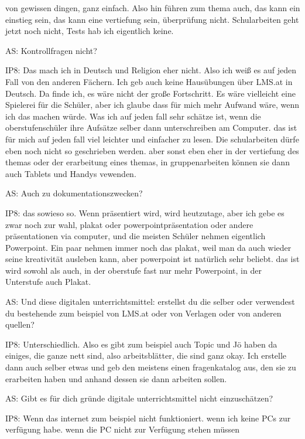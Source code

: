 \documentclass[fontsize=11pt,paper=a4]{scrbook}
\begin{document}
{\begin{itemize*}
		von gewissen dingen, ganz einfach. Also hin führen
		zum thema auch, das kann ein einstieg
		sein, 
		das kann eine vertiefung sein,
		überprüfung nicht. Schularbeiten geht jetzt noch nicht, Tests hab ich eigentlich keine.
		\item[AS:] Kontrollfragen nicht?
		\item[IP8:] Das mach ich in Deutsch und Religion eher nicht. Also ich weiß es auf jeden Fall von den anderen Fächern. Ich geb auch keine Hausübungen über LMS.at in Deutsch. Da finde ich, es wäre nicht der große Fortschritt. Es wäre vielleicht eine Spielerei für die Schüler, aber ich glaube dass für mich
		mehr Aufwand wäre, wenn ich das machen
		würde. Was ich auf jeden fall sehr schätze ist, 
		wenn die oberstufenschüler ihre Aufsätze selber dann unterschreiben am Computer.
		das ist für mich auf jeden fall
		viel leichter und einfacher zu lesen. Die
		schularbeiten dürfe eben noch nicht so geschrieben werden.
		aber sonst eben eher in der vertiefung des themas oder der erarbeitung
		eines themas, in gruppenarbeiten können sie dann auch Tablets und Handys vewenden.
		\item[AS:] Auch zu dokumentationszwecken?
		\item[IP8:] das sowieso so. Wenn präsentiert wird, wird
		heutzutage,  aber ich gebe es zwar noch
		zur wahl, plakat oder powerpointpräsentation oder andere präsentationen
		via computer, und die meisten Schüler nehmen eigentlich Powerpoint. Ein paar nehmen immer noch das plakat, weil
		man da auch wieder seine kreativität
		ausleben kann,  aber powerpoint ist
		natürlich sehr beliebt. das ist wird
		sowohl als auch, in der oberstufe fast
		nur mehr Powerpoint, in der Unterstufe auch Plakat.
		\item[AS:] Und diese digitalen
		unterrichtsmittel: erstellst du die selber
		oder verwendest du bestehende zum
		beispiel von LMS.at oder von Verlagen oder von anderen quellen?
		\item[IP8:]	Unterschiedlich. Also es gibt zum
		beispiel auch Topic und Jö haben da
		einiges,  die ganze nett sind,  also
		arbeitsblätter, die sind ganz okay. Ich
		erstelle dann auch selber etwas und geb
		den meistens einen fragenkatalog aus, den sie zu
		erarbeiten haben und anhand dessen sie dann arbeiten sollen.
		\item[AS:] Gibt es für dich gründe digitale
		unterrichtsmittel nicht einzuschätzen?
		\item[IP8:] Wenn das internet zum beispiel nicht
		funktioniert. wenn ich keine PCs zur verfügung habe.
		wenn die PC  nicht zur Verfügung stehen müssen

\end{itemize*}}
\end{document}
